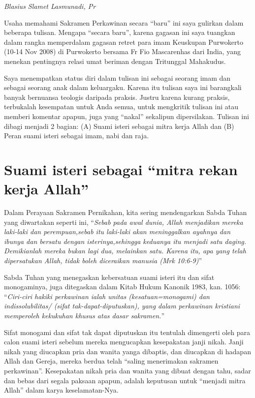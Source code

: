 
\begin{center} \textit{Blasius Slamet Lasmunadi, Pr} \end{center}

\small
    Usaha memahami Sakramen Perkawinan secara ``baru'' ini saya gulirkan
    dalam beberapa tulisan. Mengapa ``secara baru'', karena gagasan ini
    saya tuangkan dalam rangka memperdalam gagasan retret para imam
    Keuskupan Purwokerto (10-14 Nov 2008) di Purwokerto bersama Fr Fio
    Mascarenhas dari India, yang menekan pentingnya relasi umat beriman
    dengan Tritunggal Mahakudus.
    	
    Saya menempatkan status diri dalam tulisan ini sebagai seorang
    imam dan sebagai  seorang anak dalam keluargaku. Karena itu tulisan
    saya ini barangkali banyak bernuansa teologis daripada praksis.
    Justru karena kurang praksis, terbukalah kesempatan untuk Anda
    semua, untuk mengkritik tulisan ini atau memberi komentar apapun,
    juga yang ``nakal'' sekalipun dipersilakan.
    Tulisan ini dibagi menjadi 2 bagian: (A) Suami isteri sebagai mitra
    kerja Allah dan (B) Peran suami isteri sebagai imam, nabi dan raja.
\normalsize

\section{Suami isteri sebagai ``mitra rekan kerja Allah''}
    Dalam Perayaan Sakramen Pernikahan, kita sering mendengarkan Sabda
    Tuhan yang diwartakan seperti ini, ``\textit{Sebab pada awal dunia, Allah
    menjadikan mereka laki-laki dan perempuan,sebab itu laki-laki akan
    meninggalkan ayahnya dan ibunya dan bersatu dengan
    isterinya,sehingga keduanya itu menjadi satu daging. Demikianlah
    mereka bukan lagi dua, melainkan satu. Karena itu, apa yang telah
    dipersatukan Allah, tidak boleh diceraikan manusia (Mrk 10:6-9)}''
    
    Sabda Tuhan yang menegaskan kebersatuan suami isteri itu dan sifat
    monogaminya, juga ditegaskan dalam Kitab Hukum Kanonik 1983, kan. 1056:\\
    ``\textit{Ciri-ciri hakiki perkawinan ialah unitas (kesatuan=monogami) dan
    indissolubilitas/ (sifat tak-dapat-diputuskan), yang dalam
    perkawinan kristiani memperoleh kekukuhan khusus atas dasar sakramen.}''
    
    Sifat monogami dan sifat tak dapat diputuskan itu tentulah
    dimengerti oleh para calon suami isteri sebelum mereka mengucapkan
    kesepakatan janji nikah. Janji nikah yang diucapkan pria dan wanita
    yanga dibaptis, dan diucapkan di hadapan Allah dan Gereja, mereka
    berdua telah ``saling menerimakan sakramen perkawinan''. Kesepakatan
    nikah pria dan wanita yang dibuat  dengan tahu, sadar dan bebas dari
    segala paksaan apapun, adalah keputusan untuk ``menjadi mitra Allah''
    dalam karya keselamatan-Nya.

